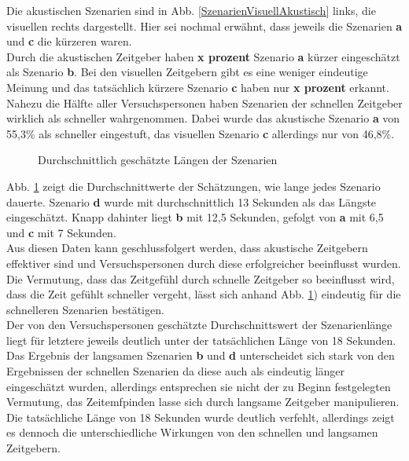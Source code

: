 \documentclass{Paper}
\begin{document}
 Die akustischen Szenarien sind in Abb. \ref{SzenarienVisuellAkustisch} links, die visuellen rechts dargestellt. Hier sei nochmal erwähnt, dass jeweils die Szenarien \textbf{a} und \textbf{c} die kürzeren waren.\\
Durch die akustischen Zeitgeber haben \textbf{x prozent} Szenario \textbf{a} kürzer eingeschätzt als Szenario \textbf{b}. Bei den visuellen Zeitgebern gibt es eine weniger eindeutige Meinung und das tatsächlich kürzere Szenario \textbf{c} haben nur \textbf{x prozent} erkannt.\\
Nahezu die Hälfte aller Versuchspersonen haben Szenarien der schnellen Zeitgeber wirklich als schneller wahrgenommen. Dabei wurde das akustische Szenario \textbf{a} von 55,3\% als schneller eingestuft, das visuellen Szenario \textbf{c} allerdings nur von 46,8\%.\\
\begin{figure}        [H]
\caption{Durchschnittlich geschätzte Längen der Szenarien}
\label{LaengeSzenarien}
\end{figure}


Abb. \ref{LaengeSzenarien} zeigt die Durchschnittwerte der Schätzungen, wie lange jedes Szenario dauerte. Szenario \textbf{d} wurde mit durchschnittlich 13 Sekunden als das Längste eingeschätzt. Knapp dahinter liegt \textbf{b} mit 12,5 Sekunden, gefolgt von \textbf{a} mit 6,5 und \textbf{c} mit 7 Sekunden.\\
Aus diesen Daten kann geschlussfolgert werden, dass akustische Zeitgebern effektiver sind und Versuchspersonen durch diese erfolgreicher beeinflusst wurden. Die Vermutung, dass das Zeitgefühl durch schnelle Zeitgeber so beeinflusst wird, dass die Zeit gefühlt schneller vergeht, lässt sich anhand Abb. \ref{LaengeSzenarien}) eindeutig für die schnelleren Szenarien bestätigen.\\
Der von den Versuchspersonen geschätzte Durchschnittswert der Szenarienlänge liegt für letztere jeweils deutlich unter der tatsächlichen Länge von 18 Sekunden. Das Ergebnis der langsamen Szenarien \textbf{b} und
\textbf{d} unterscheidet sich stark von den Ergebnissen der schnellen Szenarien da diese auch als eindeutig länger eingeschätzt wurden, allerdings
entsprechen sie nicht der zu Beginn festgelegten Vermutung, das Zeitemfpinden lasse sich durch langsame Zeitgeber manipulieren. Die tatsächliche Länge von 18 Sekunden wurde deutlich verfehlt, allerdings zeigt es dennoch
die unterschiedliche Wirkungen von den schnellen und langsamen Zeitgebern.
       
\end{document}

